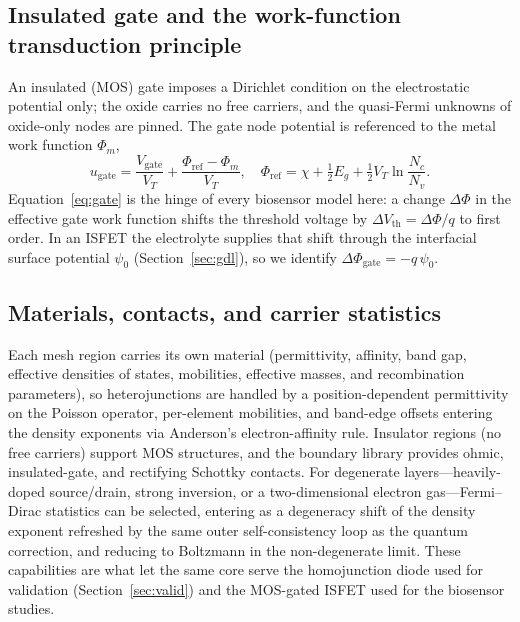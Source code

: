 \documentclass[10pt,journal]{IEEEtran}
\begin{document}
\subsection{Insulated gate and the work-function transduction principle}
An insulated (MOS) gate imposes a Dirichlet condition on the electrostatic
potential only; the oxide carries no free carriers, and the quasi-Fermi unknowns
of oxide-only nodes are pinned. The gate node potential is referenced to the
metal work function $\Phi_m$,
\begin{equation}
  u_{\mathrm{gate}}=\frac{V_{\mathrm{gate}}}{V_T}
    +\frac{\Phi_{\mathrm{ref}}-\Phi_m}{V_T},\quad
  \Phi_{\mathrm{ref}}=\chi+\tfrac{1}{2}E_g+\tfrac{1}{2}V_T\ln\frac{N_c}{N_v}.
  \label{eq:gate}
\end{equation}
Equation~\eqref{eq:gate} is the hinge of every biosensor model here: a change
$\Delta\Phi$ in the effective gate work function shifts the threshold voltage by
$\Delta V_{\mathrm{th}}=\Delta\Phi/q$ to first order. In an ISFET the electrolyte
supplies that shift through the interfacial surface potential $\psi_0$
(Section~\ref{sec:gdl}), so we identify $\Delta\Phi_{\mathrm{gate}}=-q\,\psi_0$.

\subsection{Materials, contacts, and carrier statistics}
Each mesh region carries its own material (permittivity, affinity, band gap,
effective densities of states, mobilities, effective masses, and
recombination parameters), so heterojunctions are handled by a position-dependent
permittivity on the Poisson operator, per-element mobilities, and band-edge
offsets entering the density exponents via Anderson's electron-affinity rule.
Insulator regions (no free carriers) support MOS structures, and the boundary
library provides ohmic, insulated-gate, and rectifying Schottky contacts. For
degenerate layers---heavily-doped source/drain, strong inversion, or a
two-dimensional electron gas---Fermi--Dirac statistics can be selected, entering
as a degeneracy shift of the density exponent refreshed by the same outer
self-consistency loop as the quantum correction, and reducing to Boltzmann in the
non-degenerate limit. These capabilities are what let the same core serve the
homojunction diode used for validation (Section~\ref{sec:valid}) and the
MOS-gated ISFET used for the biosensor studies.
\end{document}
